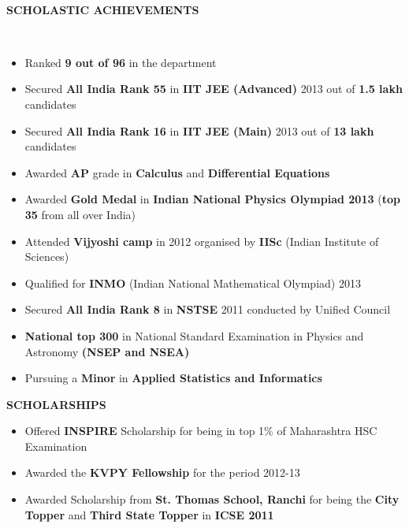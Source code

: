 \documentclass[a4paper,10pt]{article}
\newcommand{\lsep}{-0.5cm}
\newcommand{\resheading}[1]{{\small \colorbox{mygrey}{\begin{minipage}{0.975\textwidth}{\textbf{#1 \vphantom{p\^{E}}}}\end{minipage}}}}
\begin{document}
\hspace{0.5cm}\\[-0.1cm]

\vspace{50mm}

\resheading{\textbf{SCHOLASTIC ACHIEVEMENTS} }\\[\lsep]
\begin{itemize}
\itemsep 0em
\item  Ranked {\bf 9 out of 96} in the department
\item  Secured {\bf All India Rank 55} in {\bf IIT JEE (Advanced)} 2013 out of {\bf 1.5 lakh} candidates
\item  Secured {\bf All India Rank 16} in {\bf IIT JEE (Main)} 2013 out of {\bf 13 lakh} candidates
\item  Awarded {\bf AP} grade in {\bf Calculus} and {\bf Differential Equations} 
\item  Awarded {\bf Gold Medal } in {\bf Indian National Physics Olympiad 2013 }({\bf top 35 } from all over India)
\item  Attended {\bf Vijyoshi camp} in 2012 organised by {\bf IISc} (Indian Institute of Sciences)
\item  Qualified for {\bf INMO} (Indian National Mathematical Olympiad) 2013
\item  Secured {\bf All India Rank 8} in {\bf NSTSE} 2011 conducted by Unified Council
\item  {\bf National top 300} in National Standard Examination in Physics and Astronomy {\bf (NSEP and NSEA)}
\item  Pursuing a {\bf Minor} in {\bf Applied Statistics and Informatics}
\end{itemize}

\resheading{\textbf{SCHOLARSHIPS}}
\begin{itemize}
\itemsep 0em
 \item Offered {\bf INSPIRE} Scholarship for being in top 1\% of Maharashtra HSC Examination
 \item Awarded the {\bf KVPY Fellowship} for the period 2012-13
 \item Awarded Scholarship from {\bf St. Thomas School, Ranchi} for being the {\bf City Topper} and {\bf Third State Topper} in {\bf ICSE 2011}
\end{itemize}
\end{document}
